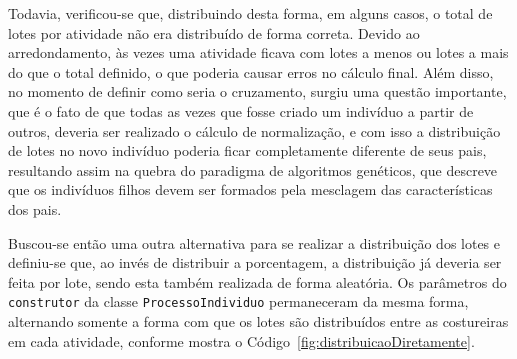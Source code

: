  \par Todavia, verificou-se que, distribuindo desta forma, em alguns casos, o total de lotes por atividade não era distribuído
 de forma correta. Devido ao arredondamento, às vezes uma atividade ficava com lotes a menos ou lotes a mais do que o total
 definido, o que poderia causar erros no cálculo final. Além disso, no momento de definir como seria o cruzamento, 
 surgiu uma questão importante, que é o fato de que todas as vezes que fosse criado um indivíduo a partir de outros, deveria
 ser realizado o cálculo de normalização, e com isso a distribuição de lotes no novo indivíduo poderia ficar completamente
 diferente de seus pais, resultando assim na quebra do paradigma de algoritmos genéticos, que descreve que os indivíduos filhos
 devem ser formados pela mesclagem das características dos pais. 


\par Buscou-se então uma outra alternativa para se realizar a distribuição dos lotes e definiu-se que, ao invés de distribuir
a porcentagem, a distribuição já deveria ser feita por lote, sendo esta também realizada de forma aleatória. Os parâmetros
do \texttt{construtor} da classe \texttt{ProcessoIndividuo} permaneceram da mesma forma, alternando somente a forma com que 
os lotes são distribuídos entre as costureiras em cada atividade, conforme mostra
o Código~\ref{fig:distribuicaoDiretamente}.


